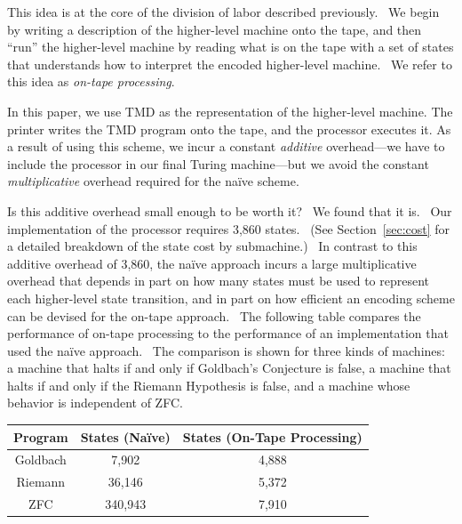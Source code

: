 \documentclass[11pt]{article}
\newcommand{\statenum}{7,910 }
\newcommand{\gbstatenum}{4,888 }
\newcommand{\rmstatenum}{5,372 }
\begin{document}
This idea is at the core of the division of labor described previously. \ We begin by writing a description of the higher-level machine onto the tape, and then ``run'' the higher-level machine by reading what is on the tape with a set of states that understands how to interpret the encoded higher-level machine. \ We refer to this idea as \emph{on-tape processing}.

In this paper, we use TMD as the representation of the higher-level machine.\footnotemark
{}
The printer writes the TMD program onto the tape, and the processor executes it. As a result of using this scheme, we incur a constant \emph{additive} overhead---we have to include the processor in our final Turing machine---but we avoid the constant \emph{multiplicative} overhead required for the na\"ive scheme.

Is this additive overhead small enough to be worth it? \ We found that it is. \ Our implementation of the processor requires 3,860 states. \ (See Section~\ref{sec:cost} for a detailed breakdown of the state cost by submachine.) \ In contrast to this additive overhead of 3,860, the na\"ive approach incurs a large multiplicative overhead that depends in part on how many states must be used to represent each higher-level state transition, and in part on how efficient an encoding scheme can be devised for the on-tape approach. \ The following table compares the performance of on-tape processing to the performance of an implementation that used the na\"ive approach. \ The comparison is shown for three kinds of machines: a machine that halts if and only if Goldbach's Conjecture is false, a machine that halts if and only if the Riemann Hypothesis is false, and a machine whose behavior is independent of ZFC.

\begin{center}
    \begin{tabular}{||c c c||}
    \hline
    Program & States (Na\"ive) & States (On-Tape Processing) \\ [0.5ex]
    \hline
    Goldbach & 7,902 & \gbstatenum\\
    \hline
    Riemann & 36,146 & \rmstatenum\\
    \hline
    ZFC & 340,943 & \statenum\\
    \hline
    \end{tabular}
\end{center}
\end{document}
